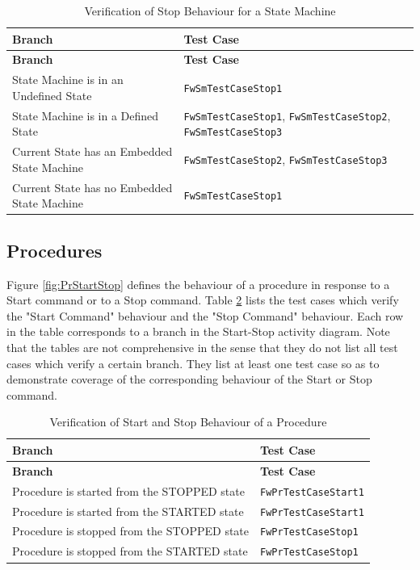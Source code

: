 \documentclass[a4paper,10pt]{article}
\begin{document}
\begin{longtable}{|p{7.7cm}|p{3.5cm}|}
\caption{Verification of Stop Behaviour for a State Machine} \label{tab:SM_Stop}\\
\hline
\rowcolor{gray}
\textbf{Branch} & \textbf{Test Case} \\
\hline
\endfirsthead
\rowcolor{gray}
\textbf{Branch} & \textbf{Test Case} \\
\hline
\endhead
State Machine is in an Undefined State & \texttt{FwSmTestCaseStop1} \\
\hline
State Machine is in a Defined State & \texttt{FwSmTestCaseStop1}, \texttt{FwSmTestCaseStop2}, \texttt{FwSmTestCaseStop3} \\
\hline
Current State has an Embedded State Machine & \texttt{FwSmTestCaseStop2}, \texttt{FwSmTestCaseStop3} \\
\hline
Current State has no Embedded State Machine & \texttt{FwSmTestCaseStop1} \\
\hline
\end{longtable}

\subsection{Procedures}\label{Appendix_C_PR_Start_Stop}
Figure \ref{fig:PrStartStop} defines the behaviour of a procedure in response to a 
Start command or to a Stop command. 
Table \ref{tab:PR_StartStop} lists the test cases which verify the "Start Command" 
behaviour and the "Stop Command" behaviour. 
Each row in the table corresponds to a branch in the Start-Stop activity diagram. 
Note that the tables are not comprehensive in the sense that they do not list all test 
cases which verify a certain branch. 
They list at least one test case so as to demonstrate coverage  of the corresponding 
behaviour of the Start or Stop command.

\begin{longtable}{|p{7.7cm}|p{3.5cm}|}
\caption{Verification of Start and Stop Behaviour of a Procedure}\label{tab:PR_StartStop} \\
\hline
\rowcolor{gray}
\textbf{Branch} & \textbf{Test Case} \\
\hline
\endfirsthead
\rowcolor{gray}
\textbf{Branch} & \textbf{Test Case} \\
\hline
\endhead
Procedure is started from the STOPPED state & \texttt{FwPrTestCaseStart1} \\
\hline
Procedure is started from the STARTED state & \texttt{FwPrTestCaseStart1} \\
\hline
Procedure is stopped from the STOPPED state & \texttt{FwPrTestCaseStop1} \\
\hline
Procedure is stopped from the STARTED state & \texttt{FwPrTestCaseStop1} \\
\hline
\end{longtable}
\end{document}
